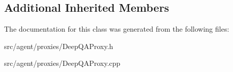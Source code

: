 \subsection*{Additional Inherited Members}


The documentation for this class was generated from the following files\+:\begin{DoxyCompactItemize}
\item 
src/agent/proxies/Deep\+Q\+A\+Proxy.\+h\item 
src/agent/proxies/Deep\+Q\+A\+Proxy.\+cpp\end{DoxyCompactItemize}
